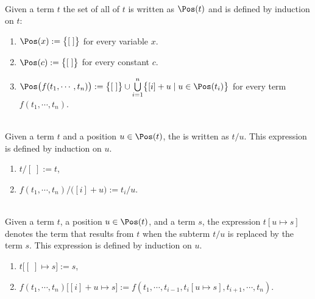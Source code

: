 \begin{Definition} \hspace*{\fill} \\
  Given a term $t$ the set of all  of $t$ is written as $\Pos(t)$ and is defined by
  induction on $t$:
  \begin{enumerate}
  \item $\Pos(x) := \bigl\{ [\;] \bigr\}$ \quad for every variable $x$.
  \item $\Pos(c) := \bigl\{ [\;] \bigr\}$ \quad for every constant $c$.
  \item $\Pos\bigl(f(t_1,\cdots,t_n)\bigr) := 
         \bigl\{ [\;] \bigr\} \cup \bigcup\limits_{i=1}^n \bigl\{ [i] + u \mid u \in \Pos(t_i) \bigr\}$ 
        \quad for every term $f(t_1,\cdots,t_n)$. \eoxs
  \end{enumerate}
\end{Definition}

\begin{Definition} \hspace*{\fill} \\
  Given a term $t$ and a position $u \in \Pos(t)$, the  is
  written as $t/u$.  This expression is defined by induction on $u$.
  \begin{enumerate}
  \item $t/[\;] := t$,
  \item $f(t_1,\cdots,t_n)/\bigl([i]+u\bigr) := t_i/u$.  \eoxs
  \end{enumerate}
\end{Definition}
\pagebreak

\begin{Definition} \hspace*{\fill} \\
  Given a term $t$, a position $u \in \Pos(t)$, and a term $s$, the expression
  $t[u \mapsto s]$ denotes the term that results from $t$ when the subterm $t/u$ is replaced by the term 
  $s$.  This expression is defined by induction on $u$.
  \begin{enumerate}
  \item $t\bigl[ [\;] \mapsto s \bigr] := s$,
  \item $f(t_1,\cdots,t_n)\bigl[ [i]+u \mapsto s \bigr] := f(t_1, \cdots, t_{i-1},t_i[u \mapsto s], t_{i+1},\cdots, t_n)$.  
        \eoxs
  \end{enumerate}
\end{Definition}
  
